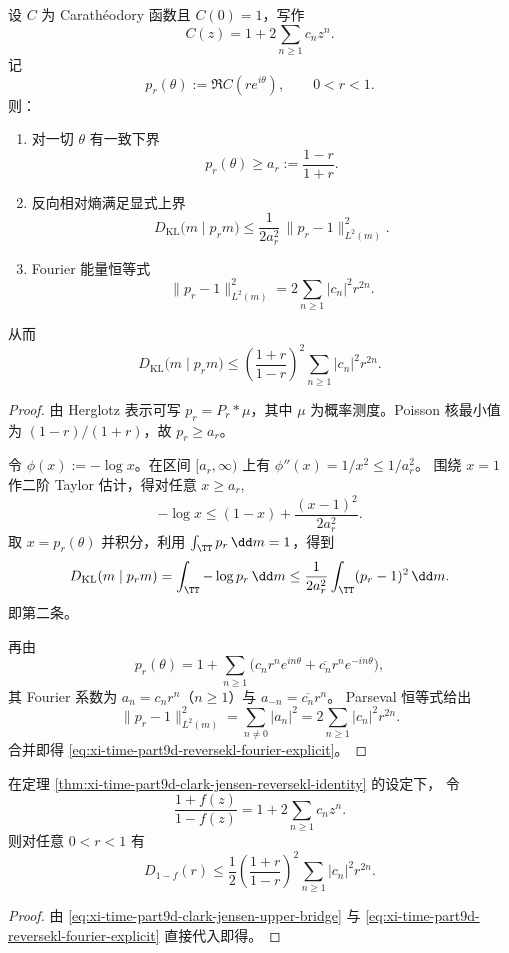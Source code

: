 \begin{theorem}\label{thm:xi-time-part9d-reversekl-l2-fourier}
设 \(C\) 为 Carath\'eodory 函数且 \(C(0)=1\)，写作
\[
C(z)=1+2\sum_{n\ge1}c_n z^n.
\]
记
\[
p_r(\theta):=\Re C(re^{i\theta}),\qquad 0<r<1.
\]
则：
\begin{enumerate}
  \item 对一切 \(\theta\) 有一致下界
  \[
  p_r(\theta)\ge a_r:=\frac{1-r}{1+r}.
  \]
  \item 反向相对熵满足显式上界
  \[
  D_{\mathrm{KL}}\!\bigl(m\mid p_rm\bigr)
  \le \frac{1}{2a_r^2}\,\|p_r-1\|_{L^2(m)}^2.
  \]
  \item Fourier 能量恒等式
  \[
  \|p_r-1\|_{L^2(m)}^2
  =2\sum_{n\ge1}|c_n|^2r^{2n}.
  \]
\end{enumerate}
从而
\begin{equation}\label{eq:xi-time-part9d-reversekl-fourier-explicit}
D_{\mathrm{KL}}\!\bigl(m\mid p_rm\bigr)
\le \left(\frac{1+r}{1-r}\right)^2\sum_{n\ge1}|c_n|^2r^{2n}.
\end{equation}
\end{theorem}
\begin{proof}
由 Herglotz 表示可写 \(p_r=P_r*\mu\)，其中 \(\mu\) 为概率测度。Poisson 核最小值为 \((1-r)/(1+r)\)，故 \(p_r\ge a_r\)。

令 \(\phi(x):=-\log x\)。在区间 \([a_r,\infty)\) 上有 \(\phi''(x)=1/x^2\le 1/a_r^2\)。
围绕 \(x=1\) 作二阶 Taylor 估计，得对任意 \(x\ge a_r\),
\[
-\log x\le (1-x)+\frac{(x-1)^2}{2a_r^2}.
\]
取 \(x=p_r(\theta)\) 并积分，利用 \(\int_{\TT}p_r\,\dd m=1\)，得到
\[
D_{\mathrm{KL}}(m\mid p_rm)=\int_{\TT}-\log p_r\,\dd m
\le \frac{1}{2a_r^2}\int_{\TT}(p_r-1)^2\,\dd m.
\]
即第二条。

再由
\[
p_r(\theta)
=1+\sum_{n\ge1}\bigl(c_nr^n e^{in\theta}+\overline{c_n}r^n e^{-in\theta}\bigr),
\]
其 Fourier 系数为 \(a_n=c_nr^n\)（\(n\ge1\)）与 \(a_{-n}=\overline{c_n}r^n\)。
Parseval 恒等式给出
\[
\|p_r-1\|_{L^2(m)}^2
=\sum_{n\ne0}|a_n|^2
=2\sum_{n\ge1}|c_n|^2r^{2n}.
\]
合并即得 \eqref{eq:xi-time-part9d-reversekl-fourier-explicit}。
\end{proof}

\begin{corollary}\label{cor:xi-time-part9d-jensen-defect-coefficient-certificate}
在定理 \ref{thm:xi-time-part9d-clark-jensen-reversekl-identity} 的设定下，
令
\[
\frac{1+f(z)}{1-f(z)}=1+2\sum_{n\ge1}c_n z^n.
\]
则对任意 \(0<r<1\) 有
\begin{equation}\label{eq:xi-time-part9d-jensen-defect-coefficient-certificate}
D_{1-f}(r)
\le \frac12\left(\frac{1+r}{1-r}\right)^2\sum_{n\ge1}|c_n|^2r^{2n}.
\end{equation}
\end{corollary}
\begin{proof}
由 \eqref{eq:xi-time-part9d-clark-jensen-upper-bridge} 与
\eqref{eq:xi-time-part9d-reversekl-fourier-explicit} 直接代入即得。
\end{proof}


